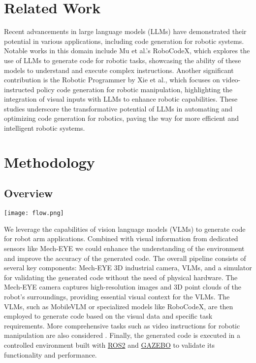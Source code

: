 \documentclass[conference]{IEEEtran}
\begin{document}
\section{Related Work}
Recent advancements in large language models (LLMs) have demonstrated their potential in various applications, including code generation for robotic systems. Notable works in this domain include Mu et al.'s RoboCodeX\cite{mu2024robocodex}, which explores the use of LLMs to generate code for robotic tasks, showcasing the ability of these models to understand and execute complex instructions. Another significant contribution is the Robotic Programmer by Xie et al.\cite{xie2025robotic}, which focuses on video-instructed policy code generation for robotic manipulation, highlighting the integration of visual inputs with LLMs to enhance robotic capabilities. These studies underscore the transformative potential of LLMs in automating and optimizing code generation for robotics, paving the way for more efficient and intelligent robotic systems.

\section{Methodology}
\subsection{Overview}
\texttt{[image: flow.png]}

We leverage the capabilities of vision language models (VLMs) to generate code for robot arm applications. Combined with visual information from dedicated sensors like Mech-EYE we could enhance the understanding of the environment and improve the accuracy of the generated code. 
The overall pipeline consists of several key components: Mech-EYE 3D industrial camera, VLMs, and a simulator for validating the generated code without the need of physical hardware. The Mech-EYE camera captures high-resolution images and 3D point clouds of the robot's surroundings, providing essential visual context for the VLMs. The VLMs, such as MobileVLM or specialized models like RoboCodeX\cite{mu2024robocodex}, are then employed to generate code based on the visual data and specific task requirements. More comprehensive tasks such as video instructions for robotic manipulation are also considered \cite{xie2025robotic}.
Finally, the generated code is executed in a controlled environment built with \href{https://docs.ros.org/}{ROS2} and \href{http://gazebosim.org/}{GAZEBO} to validate its functionality and performance.
\end{document}
